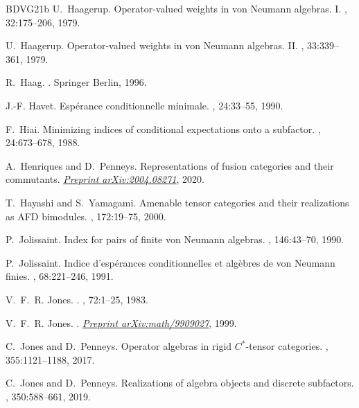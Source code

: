 \documentclass[11pt,a4paper]{article}
\theoremstyle{plain}
\theoremstyle{definition}
\theoremstyle{remark}
\numberwithin{equation}{section}%
\begin{document}
\begin{thebibliography}{BDVG21b}
U.~Haagerup.
\newblock Operator-valued weights in von {N}eumann algebras. {I}.
, 32:175--206, 1979.

U.~Haagerup.
\newblock Operator-valued weights in von {N}eumann algebras. {II}.
, 33:339--361, 1979.

R.~Haag.
.
\newblock Springer Berlin, 1996.

J.-F. Havet.
\newblock Esp{\'e}rance conditionnelle minimale.
, 24:33--55, 1990.

F.~Hiai.
\newblock Minimizing indices of conditional expectations onto a subfactor.
, 24:673--678, 1988.

A.~Henriques and D.~Penneys.
\newblock Representations of fusion categories and their commutants.
\newblock \href{https://arxiv.org/abs/2004.08271}{\em Preprint arXiv:2004.08271}, 2020.

T.~Hayashi and S.~Yamagami.
\newblock Amenable tensor categories and their realizations as {AFD} bimodules.
, 172:19--75, 2000.

P.~Jolissaint.
\newblock Index for pairs of finite von {N}eumann algebras.
, 146:43--70, 1990.

P.~Jolissaint.
\newblock Indice d'esp{\'e}rances conditionnelles et alg{\`e}bres de von
  {N}eumann finies.
, 68:221--246, 1991.

V.~F.~R. Jones.
.
, 72:1--25, 1983.

V.~F.~R. Jones.
.
\newblock \href{https://arxiv.org/abs/math/9909027}{\em Preprint arXiv:math/9909027}, 1999.

C.~Jones and D.~Penneys.
\newblock Operator algebras in rigid {$C^*$}-tensor categories.
, 355:1121--1188, 2017.

C.~Jones and D.~Penneys.
\newblock Realizations of algebra objects and discrete subfactors.
, 350:588--661, 2019.


\end{thebibliography}
\end{document}
